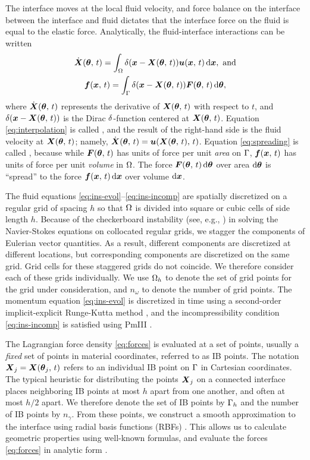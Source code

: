 The interface moves at the local fluid velocity, and force balance on the interface
between the interface and fluid dictates that the interface force on the fluid is equal
to the elastic force. Analytically, the fluid-interface interactions can be written
\begin{gather}
    \label{eq:interpolation}
    \U(\params,\,t) = \int_\domain \Dirac(\x-\X(\params,\,t)) \u(\x,\,t)\d\x,\ \text{and} \\
    \label{eq:spreading}
    \f(\x,\,t) = \int_\interface \Dirac(\x-\X(\params,\,t))\F(\params,\,t)\d\params,
\end{gather}
where $\dot{\boldsymbol{X}}(\boldsymbol{\theta},\,t)$ represents the derivative of $\boldsymbol{X}(\boldsymbol{\theta},\,t)$ with respect to
$t$, and $\delta(\boldsymbol{x}-\boldsymbol{X}(\boldsymbol{\theta},\,t))$ is the Dirac $\delta$-function centered at
$\boldsymbol{X}(\boldsymbol{\theta},\,t)$.  Equation \eqref{eq:interpolation} is called , and
the result of the right-hand side is the fluid velocity at $\boldsymbol{X}(\boldsymbol{\theta},\,t)$; namely,
$\dot{\boldsymbol{X}}(\boldsymbol{\theta},\,t) = \boldsymbol{u}(\boldsymbol{X}(\boldsymbol{\theta},\,t),\,t)$.  Equation \eqref{eq:spreading} is called
, because while $\boldsymbol{F}(\boldsymbol{\theta},\,t)$ has units of force per unit \emph{area}
on $\Gamma$, $\boldsymbol{f}(\boldsymbol{x},\,t)$ has units of force per unit \emph{volume} in $\Omega$. The
force $\F(\params,\,t)\d\params$ over area $\d\params$ is ``spread'' to the force
$\f(\x,\,t)\d\x$ over volume $\d\x$. 

The fluid equations \eqref{eq:ins-evol}--\eqref{eq:ins-incomp} are spatially discretized
on a regular grid of spacing $h$ so that $\Omega$ is divided into square or cubic cells
of side length $h$. Because of the checkerboard instability (see, e.g.,
\cite{Wesseling:2001ci}) in solving the Navier-Stokes equations on collocated regular
grids, we stagger the components of Eulerian vector quantities. As a result, different
components are discretized at different locations, but corresponding components are
discretized on the same grid. Grid cells for these staggered grids do not coincide. We
therefore consider each of these grids individually. We use $\Omega_h$ to denote the set
of grid points for the grid under consideration, and $n_\omega$ to denote the number of
grid points. The momentum equation \eqref{eq:ins-evol} is discretized in time using a
second-order implicit-explicit Runge-Kutta method \cite{Peskin:2002go}, and the
incompressibility condition \eqref{eq:ins-incomp} is satisfied using PmIII
\cite{Brown:2001bq}.

The Lagrangian force density \ref{eq:forces} is evaluated at a set of points, usually a
\emph{fixed} set of points in material coordinates, referred to as IB points. The
notation $\boldsymbol{X}_j=\boldsymbol{X}(\boldsymbol{\theta}_j,\,t)$ refers to an individual IB point on $\Gamma$ in
Cartesian coordinates. The typical heuristic for distributing the points $\boldsymbol{X}_j$ on a
connected interface places neighboring IB points at most $h$ apart from one another, and
often at most $h/2$ apart. We therefore denote the set of IB points by $\Gamma_h$ and
the number of IB points by $n_\gamma$. From these points, we construct a smooth
approximation to the interface using radial basis functions (RBFs) \cite{Shankar:2015km}.
This allows us to calculate geometric properties using well-known formulas, and evaluate
the forces \eqref{eq:forces} in analytic form \cite{Maxian:2018ek}.

